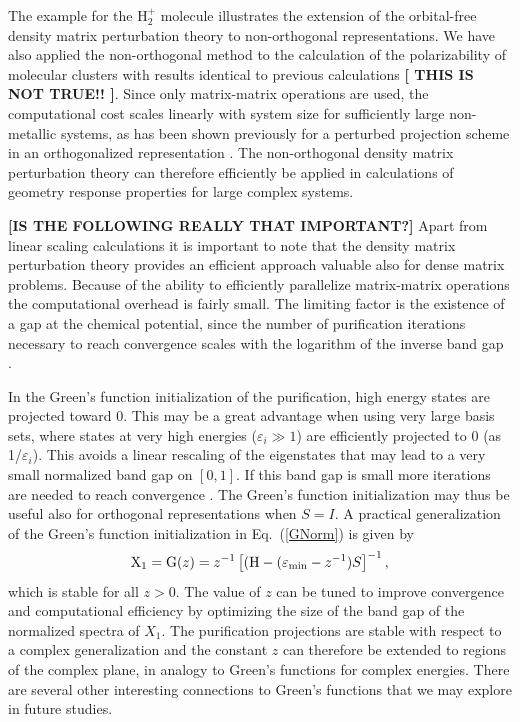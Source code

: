 \documentclass[twocolumn,showpacs,preprintnumbers,amsmath,amssymb]{revtex4}
\begin{document}
The example for the H$_2^+$ molecule illustrates the extension of the orbital-free density matrix
perturbation theory to non-orthogonal representations. We have also applied the non-orthogonal
method to the calculation of the polarizability of molecular clusters with results
identical to previous calculations \cite{VWeber05} {\bf [ THIS IS NOT TRUE!! ]}. Since 
only matrix-matrix operations are used, the computational cost 
scales linearly with system size for sufficiently large non-metallic systems, 
as has been shown previously for a perturbed projection scheme in an orthogonalized representation 
\cite{VWeber05}.  The non-orthogonal density matrix perturbation theory can therefore efficiently 
be applied in calculations of geometry response properties for large complex systems. 

{\bf [IS THE FOLLOWING REALLY THAT IMPORTANT?]}
Apart from linear scaling calculations it is important to note that the density
matrix perturbation theory provides an efficient approach valuable also for dense 
matrix problems. Because of the ability to efficiently parallelize matrix-matrix
operations the computational overhead is fairly small. The limiting factor is 
the existence of a gap at the chemical potential,
since the number of purification iterations necessary to reach convergence scales with the logarithm 
of the inverse band gap \cite{ANiklasson02A}.

In the Green's function initialization of the purification, high energy states are projected 
toward $0$.  This may be a great advantage when using very large basis sets, where states at very high energies
($\varepsilon_i \gg 1$) are efficiently projected to $0$ (as 1/$\varepsilon_i$). This avoids a linear rescaling of 
the eigenstates that may lead to
a very small normalized band gap on $[0,1]$. If this band gap is small more
iterations are needed to reach convergence \cite{ANiklasson02A,ANiklasson03}.
The Green's function initialization may thus be
useful also for orthogonal representations when $S=I$. 
A practical generalization of the
Green's function initialization in Eq.\ (\ref{GNorm}) is given by
\begin{equation}
{\rm X}_1 = {\rm G}(z) = z^{-1}\left[({\rm H} - (\varepsilon_{\rm min} - z^{-1})S\right]^{-1},
\end{equation}
which is stable for all $z > 0$. The value of $z$ can be tuned to improve convergence and computational
efficiency by optimizing the size of the band gap of the normalized spectra of $X_1$. 
The purification projections are stable with respect to a complex generalization and the
constant $z$ can therefore be extended to regions of the complex plane, in analogy to 
Green's functions for complex energies. There are several other interesting connections to Green's functions
that we may explore in future studies.
\end{document}
